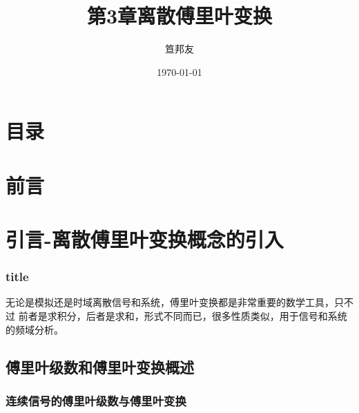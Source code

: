 \documentclass[notheorems,compress,mathserif,table]{beamer}
\title{\heiti 第3章\quad 离散傅里叶变换}
\author[\textcolor{blue}]{{\sihao\kaishu  笪邦友}}
\institute{\sihao\lishu  \textcolor{violet}{中南民族大学~~ 电子信息工程学院}}
\date{\fangsong\today}
\begin{document}
	\kaishu
	\frame{ \titlepage }
	\section*{目录}
	\section*{前言}
\section{引言-离散傅里叶变换概念的引入}
\begin{frame}\frametitle{title}%


无论是模拟还是时域离散信号和系统，傅里叶变换都是非常重要的数学工具，只不过
前者是求积分，后者是求和，形式不同而已，很多性质类似，用于信号和系统的频域分析。
\end{frame}

\subsection{傅里叶级数和傅里叶变换概述}

%
\subsubsection{连续信号的傅里叶级数与傅里叶变换}
\end{document}
